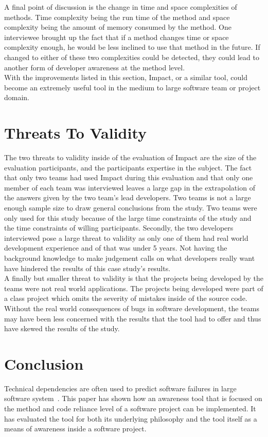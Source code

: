 \documentclass[conference]{IEEEtran}
\begin{document}
A final point of discussion is the change in time and space complexities of methods.
Time complexity being the run time of the method and space complexity being
the amount of memory consumed by the method.
One interviewee brought up the fact that if a method changes time or space
complexity enough, he would be less inclined to use that method in the future.
If changed to either of these two complexities could be detected, they could lead
to another form of developer awareness at the method level.\\

With the improvements listed in this section, Impact, or a similar tool, could become
an extremely useful tool in the medium to large software team or project
domain. \\


\section{Threats To Validity}
The two threats to validity inside of the evaluation of Impact are the size of the evaluation
participants, and the participants expertise in the subject. The fact that only two teams had
used Impact during this evaluation and that only one member of each team was interviewed
leaves a large gap in the extrapolation of the answers given by the two team's lead 
developers. Two teams is not a large enough sample size to draw general conclusions
from the study. Two teams were only used for this study because of the large time constraints
of the study and the time constraints of willing participants. Secondly, the two developers
interviewed pose a large threat to validity as only one of them had real world development
experience and of that was under 5 years. Not having the background knowledge to make
judgement calls on what developers really want have hindered the results of this case study’s 
results. \\

A finally but smaller threat to validity is that the projects being developed by the teams were
not real world applications. The projects being developed were part of a class project which
omits the severity of mistakes inside of the source code. Without the real world consequences
of bugs in software development, the teams may have been less concerned with the results
that the tool had to offer and thus have skewed the results of the study.\\

\section{Conclusion}
Technical dependencies are often used to predict software failures
in large software system~\cite{Pinzger:2008:DNP, Zimmermann:2008:PDU, Kim:2006:AIB}. 
This paper has shown how an awareness tool that is focused on the method and code reliance
level of a software project can be implemented. It has evaluated the tool for both its underlying
philosophy and the tool itself as a means of awareness inside a software project. \\
\end{document}
